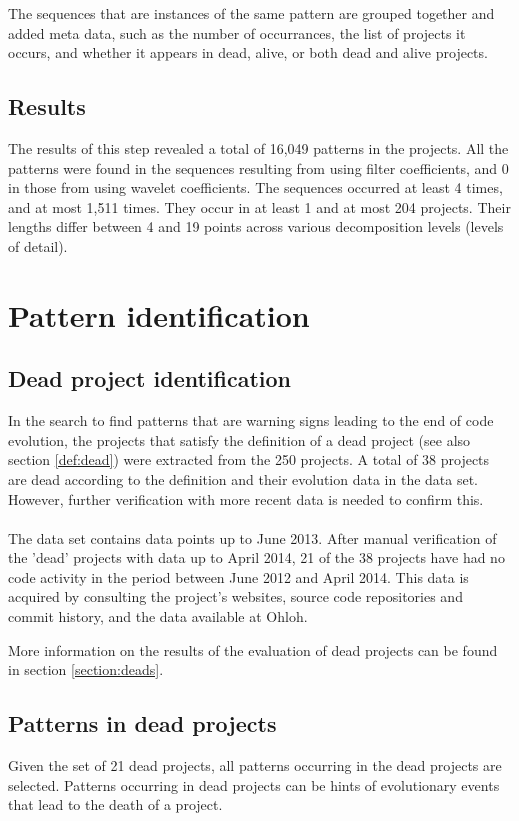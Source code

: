 The sequences that are instances of the same pattern are grouped together and
added meta data, such as the number of occurrances, the list of projects
it occurs, and whether it appears in dead, alive, or both dead and alive
projects.

\subsection{Results}
The results of this step revealed a total of 16,049 patterns in the projects.
All the patterns were found in the sequences resulting from using filter
coefficients, and 0 in those from using wavelet coefficients. The sequences
occurred at least 4 times, and at most 1,511 times. They occur in at least 1
and at most 204 projects. Their lengths differ between 4 and 19 points across
various decomposition levels (levels of detail).

\section{Pattern identification}
\subsection{Dead project identification}
In the search to find patterns that are warning signs leading to the end of
code evolution, the projects that satisfy the definition of a dead project (see
also section \ref{def:dead}) were extracted from the 250 projects.
A total of 38 projects are dead according to the definition and their evolution
data in the data set. However, further verification with more recent data is
needed to confirm this.

\paragraph{}
The data set contains data points up to June 2013. After manual verification of
the 'dead' projects with data up to April 2014, 21 of the 38 projects have had
no code activity in the period between June 2012 and April 2014. This data is
acquired by consulting the project's websites, source code repositories and
commit history, and the data available at Ohloh.

More information on the results of the evaluation of dead projects can be found
in section \ref{section:deads}.

\subsection{Patterns in dead projects}
Given the set of 21 dead projects, all patterns occurring in the dead
projects are selected. Patterns occurring in dead projects can be hints of
evolutionary events that lead to the death of a project.

